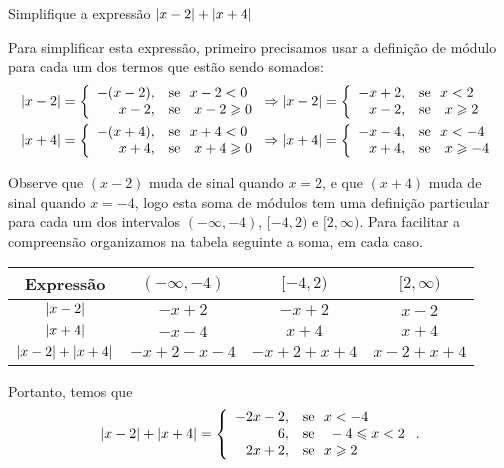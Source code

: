  \begin{exem}
  Simplifique a expressão $\left|x-2\right| + \left|x+4\right|$ \label{eqmodulo}

 Para simplificar esta expressão, primeiro precisamos usar a definição de módulo para cada um dos termos que estão sendo somados:
 \begin{align*}
    \left|x-2\right| = \left\{\begin{array}{rl}
      -(x-2), & \text{se} \ \ x-2< 0 \\
      x-2, & \text{se } \ \ x-2 \geqslant 0
     \end{array} \right.
     &\Rightarrow
     \left|x-2\right| =  \left\{\begin{array}{rl}
      -x + 2, & \text{se} \ \ x < 2 \\
      x-2, & \text{se } \ \ x \geqslant 2
     \end{array}\right.\\
      \left|x+4\right| =  \left\{\begin{array}{rl}
      -(x+4), &\text{se} \ \ x+4< 0 \\
      x+4, & \text{se } \ \ x+4 \geqslant 0
     \end{array}\right.
     &\Rightarrow
     \left|x+4\right| =  \left\{\begin{array}{rl}
      -x - 4, & \text{se} \ \ x < -4 \\
      x + 4, & \text{se } \ \ x \geqslant -4
     \end{array}\right.
  \end{align*}

  Observe que $(x-2)$ muda de sinal quando $x=2$, e que $(x+4)$ muda de sinal quando $x=-4$, logo esta soma de módulos tem uma definição particular para cada um dos intervalos $(-\infty, -4)$, $[-4, 2)$ e $[2, \infty)$. Para facilitar a compreensão organizamos na tabela seguinte a soma, em cada caso.

   \begin{table}[H]
 \centering
 \begin{tabular}{|c|c|c|c|} \hline
 \rowcolor{gray}
  Expressão & $(-\infty, -4)$ & $[-4, 2)$ & $[2, \infty)$  \\\hline
  $\left|x-2\right|$ & $-x+2$ &  $-x+2$ & $x-2$ \\\hline
  $\left|x+4\right|$ & $-x-4$ &  $x+4$ & $x+4$ \\\hline
  $\left|x-2\right| + \left|x+4\right|$ & $-x+2-x-4$ & $-x+2+x+4$ & $x-2+x+4$ \\\hline
 \end{tabular}
\end{table}

 Portanto, temos que
 \begin{equation*}
 \left|x-2\right| + \left|x+4\right| =  \left\{ \begin{array}{rl}
      -2x-2, & \text{se} \ \ x < -4 \\
      6, &\text{se } \ \ -4 \leqslant x < 2 \\
      2x + 2, & \text{se} \ \ x \geqslant 2 
     \end{array}\right..
 \end{equation*} 
 \end{exem}


